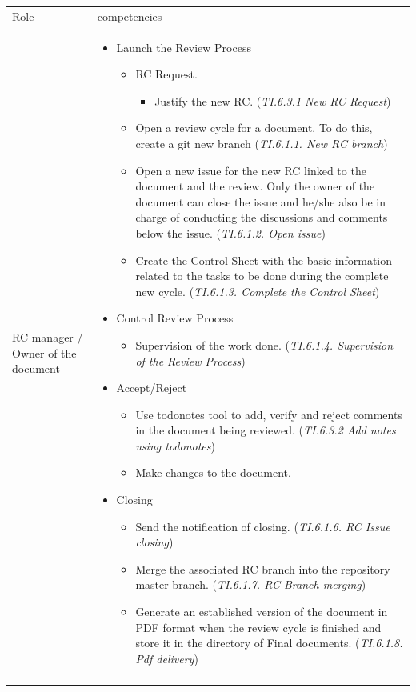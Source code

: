 \documentclass{template/openetcs_article}
\begin{document}
\begin{flushleft}

\begin{tabular}{|m{3cm}|m{11cm}|}
\hline
\rowcolor{myblue}
\multicolumn{2}{|c|}{Roles} \\\hline
\rowcolor{lightgray}
Role &
competencies \\\hline
RC manager / Owner of the document &
\begin{itemize}
\item Launch the Review Process
\begin{itemize}
\item RC Request.
\begin{itemize}
\item Justify the new RC. ({\it TI.6.3.1 New RC Request})
\end{itemize}
\item Open a review cycle for a document. To do this, create a git new branch ({\it TI.6.1.1. New RC branch}) 
\item Open a new issue for the new RC linked to the document and the review. Only the owner of the document can close the issue and he/she also be in charge of conducting the discussions and comments below the issue.  ({\it TI.6.1.2. Open issue})
\item Create the Control Sheet with the basic information related to the tasks to be done during the complete new cycle. ({\it TI.6.1.3. Complete the Control Sheet})
\end{itemize}
\item Control Review Process
\begin{itemize}
\item Supervision of the work done. ({\it TI.6.1.4. Supervision of the Review Process})
\end{itemize}
\item Accept/Reject
\begin{itemize}
\item Use todonotes tool to add, verify and reject comments in the document being reviewed. ({\it TI.6.3.2 Add notes using todonotes})
\item Make changes to the document.
\end{itemize}
\item Closing
\begin{itemize}
\item Send the notification of closing. ({\it TI.6.1.6. RC Issue closing})
\item Merge the associated RC branch into the repository master branch. ({\it TI.6.1.7. RC Branch merging})
\item Generate an established version of the document in PDF format when the review cycle is finished and store it in the directory of Final documents. ({\it TI.6.1.8. Pdf delivery})
\end{itemize}
\end{itemize}
\\\\\hline
\end{tabular}
\end{flushleft}
\end{document}
